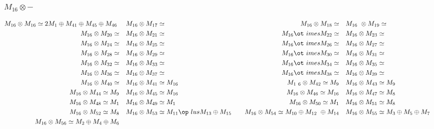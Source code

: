 \subsubsection{$M_16\otimes -$}
\begin{align*}
M_{16} \otimes M_{16} \simeq 2 M_{1} \oplus M_{41} \oplus M_{45} \oplus M_{46}\
 &&& M_{16} \otimes M_{17} \simeq  &&& M_{16} \otimes M_{18} \simeq  &&& M_{16\
} \otimes M_{19} \simeq \\
M_{16} \otimes M_{20} \simeq  &&& M_{16} \otimes M_{21} \simeq  &&& M_{16} \ot\
imes M_{22} \simeq  &&& M_{16} \otimes M_{23} \simeq \\
M_{16} \otimes M_{24} \simeq  &&& M_{16} \otimes M_{25} \simeq  &&& M_{16} \ot\
imes M_{26} \simeq  &&& M_{16} \otimes M_{27} \simeq \\
M_{16} \otimes M_{28} \simeq  &&& M_{16} \otimes M_{29} \simeq  &&& M_{16} \ot\
imes M_{30} \simeq  &&& M_{16} \otimes M_{31} \simeq \\
M_{16} \otimes M_{32} \simeq  &&& M_{16} \otimes M_{33} \simeq  &&& M_{16} \ot\
imes M_{34} \simeq  &&& M_{16} \otimes M_{35} \simeq \\
M_{16} \otimes M_{36} \simeq  &&& M_{16} \otimes M_{37} \simeq  &&& M_{16} \ot\
imes M_{38} \simeq  &&& M_{16} \otimes M_{39} \simeq \\
M_{16} \otimes M_{40} \simeq  &&& M_{16} \otimes M_{41} \simeq M_{16} &&& M_{1\
6} \otimes M_{42} \simeq M_{9} &&& M_{16} \otimes M_{43} \simeq M_{9}\\
M_{16} \otimes M_{44} \simeq M_{9} &&& M_{16} \otimes M_{45} \simeq M_{16} &&&\
 M_{16} \otimes M_{46} \simeq M_{16} &&& M_{16} \otimes M_{47} \simeq M_{8}\\
M_{16} \otimes M_{48} \simeq M_{1} &&& M_{16} \otimes M_{49} \simeq M_{1} &&& \
M_{16} \otimes M_{50} \simeq M_{1} &&& M_{16} \otimes M_{51} \simeq M_{8}\\
M_{16} \otimes M_{52} \simeq M_{8} &&& M_{16} \otimes M_{53} \simeq M_{11} \op\
lus M_{13} \oplus M_{15} &&& M_{16} \otimes M_{54} \simeq M_{10} \oplus M_{12}\
 \oplus M_{14} &&& M_{16} \otimes M_{55} \simeq M_{3} \oplus M_{5} \oplus M_{7\
}\\
M_{16} \otimes M_{56} \simeq M_{2} \oplus M_{4} \oplus M_{6}\\
\end{align*}

